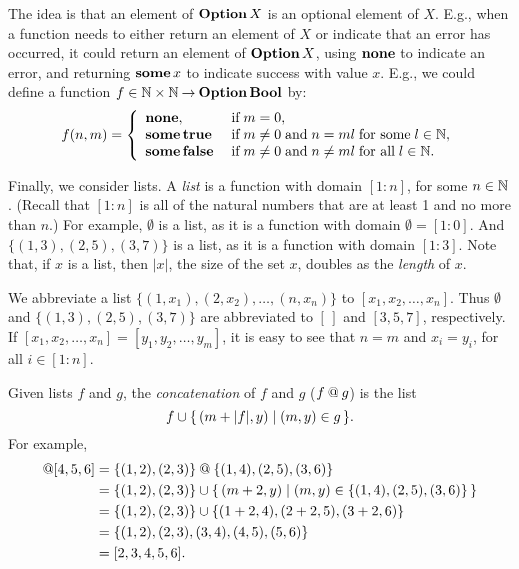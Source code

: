 The idea is that an element of $\mathbf{Option}\,X$ is an optional element
of $X$.  E.g., when a function needs to either return an element of $X$
or indicate that an error has occurred, it could return an
element of $\mathbf{Option}\,X$, using $\mathbf{none}$ to indicate an error,
and returning $\mathbf{some}\,x$ to indicate success with value $x$.
E.g., we could define a function
$f\in\mathbb{N}\times\mathbb{N}\mathbin{\to}\mathbf{Option}\,\mathbf{Bool}$ by:
\begin{gather*}
f(n,m) =
\left\{ \begin{array}{ll}
\mathbf{none}, & \;\allowbreak\mbox{if}\allowbreak\;m=0, \\
\mathbf{some}\,\mathbf{true} & \;\allowbreak\mbox{if}\allowbreak\;m\neq 0 \;\allowbreak\mbox{and}\allowbreak\;
n=ml \;\allowbreak\mbox{for some}\allowbreak\;l\in\mathbb{N}, \\
\mathbf{some}\,\mathbf{false} & \;\allowbreak\mbox{if}\allowbreak\;m\neq 0 \;\allowbreak\mbox{and}\allowbreak\;
n\neq ml \;\allowbreak\mbox{for all}\allowbreak\;l\in\mathbb{N} .
\end{array} \right.  
\end{gather*}

%
Finally, we consider lists.  A \emph{list} is a function with domain
$[1:n]$, for some $n\in\mathbb{N}$.  (Recall that $[1:n]$ is all of the
natural numbers that are at least 1 and no more than $n$.)
For example, $\emptyset$ is a list, as
it is a function with domain $\emptyset=[1:0]$.  And $\{(1, 3), (2,
5), (3, 7)\}$ is a list, as it is a function with domain $[1:3]$.
Note that, if $x$ is a list, then $|x|$, the size of the set $x$,
%
%
doubles as the \emph{length} of $x$.

We abbreviate a list $\{(1,x_1),(2,x_2),\ldots,(n,x_n)\}$ to
$[x_1,x_2,\ldots,x_n]$.
%
%
Thus $\emptyset$ and $\{(1, 3), (2, 5), (3,
7)\}$ are abbreviated to $[\,]$ and $[3,5,7]$, respectively.
If $[x_1,x_2,\ldots,x_n]=[y_1,y_2,\ldots,y_m]$, it is easy to
see that $n=m$ and $x_i=y_i$, for all $i\in[1:n]$.

Given lists $f$ and $g$, the \emph{concatenation} of $f$ and $g$
($f\mathbin{@} g$)
%
%
%
%
is the list
\begin{displaymath}
f\cup\{ \, (m+|f|,y) \mid (m,y)\in g \, \} .  
\end{displaymath}
For example,
\begin{align*}
[2, 3]\myconcat[4,5,6] &=
\{(1, 2), (2, 3)\}\myconcat\{(1, 4), (2, 5), (3, 6)\} \\
&= \{(1, 2), (2, 3)\} \cup
\setof{(m+2,y)}{(m,y)\in\{(1, 4), (2, 5), (3, 6)\}} \\
&= \{(1, 2), (2, 3)\} \cup
\{(1 + 2, 4), (2 + 2, 5), (3 + 2, 6)\} \\
&= \{(1, 2), (2, 3), (3, 4), (4, 5), (5, 6)\} \\
&= [2,3,4,5,6] .
\end{align*}

